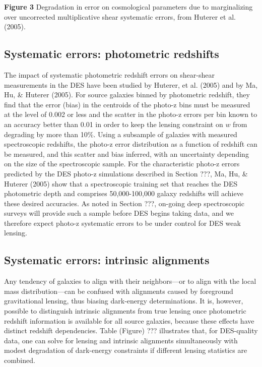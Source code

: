 \documentclass[preprint]{aastex}
\begin{document}
{\bf Figure 3}  Degradation in error on cosmological parameters due to
marginalizing over uncorrected multiplicative shear systematic
errors, from Huterer et al. (2005).

\subsection{Systematic errors: photometric redshifts}

The impact of systematic photometric redshift errors on shear-shear
measurements in the DES have been studied by Huterer, et al. (2005)
and by Ma, Hu, \& Huterer (2005). 
For source galaxies binned by photometric redshift, they find
that the error (bias) in the centroids of the photo-z bins must be
measured at the level of 0.002 or less and the scatter in the
photo-z errors per bin known to an accuracy better than 0.01 in
order to keep the lensing constraint on $w$ from degrading by more
than 10\%. Using a subsample of galaxies with measured spectroscopic
redshifts, the photo-z error distribution as a function of redshift
can be measured, and this scatter and bias inferred, with an
uncertainty depending on the size of the spectroscopic sample. For
the characteristic photo-z errors predicted by the DES photo-z
simulations described in Section ???, Ma, Hu, \& Huterer (2005) show
that a spectroscopic training set that reaches the DES
photometric depth and comprises 50,000-100,000 galaxy redshifts will
achieve these desired accuracies. As noted in Section ???, on-going
deep spectroscopic surveys will provide such a sample before DES
begins taking data, and we therefore expect photo-z systematic
errors to be under control for DES weak lensing.

\subsection{Systematic errors: intrinsic alignments}

Any tendency of galaxies to align with their neighbors---or to align
with the local mass distribution---can be confused with alignments
caused by foreground gravitational lensing, thus biasing dark-energy
determinations.  It is, however, possible to distinguish intrinsic
alignments from true lensing once photometric redshift information is
available for all source galaxies, because these effects have distinct
redshift dependencies.  Table (Figure) ??? illustrates that, for
DES-quality data, one can solve for lensing and intrinsic alignments 
simultaneously with modest degradation of dark-energy constraints if
different lensing statistics are combined. 
\end{document}
